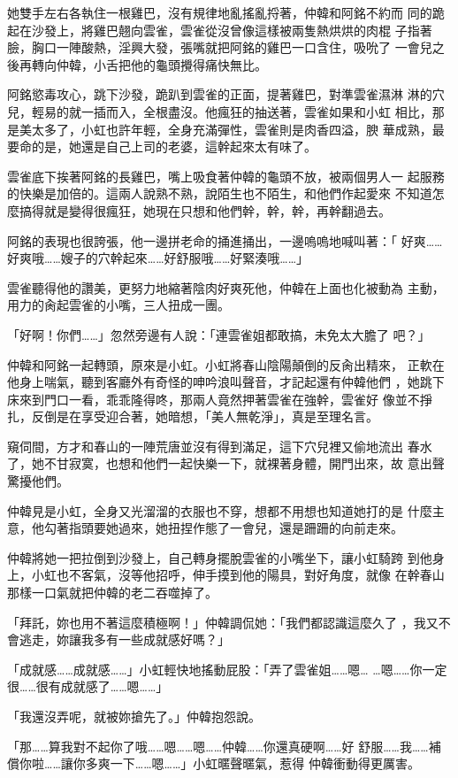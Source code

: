 她雙手左右各執住一根雞巴，沒有規律地亂搖亂捋著，仲韓和阿銘不約而
同的跪起在沙發上，將雞巴翹向雲雀，雲雀從沒曾像這樣被兩隻熱烘烘的肉棍
子指著臉，胸口一陣酸熱，淫興大發，張嘴就把阿銘的雞巴一口含住，吸吮了
一會兒之後再轉向仲韓，小舌把他的龜頭攪得痛快無比。

阿銘慾毒攻心，跳下沙發，跪趴到雲雀的正面，提著雞巴，對準雲雀濕淋
淋的穴兒，輕易的就一插而入，全根盡沒。他瘋狂的抽送著，雲雀如果和小虹
相比，那是美太多了，小虹也許年輕，全身充滿彈性，雲雀則是肉香四溢，腴
華成熟，最要命的是，她還是自己上司的老婆，這幹起來太有味了。

雲雀底下挨著阿銘的長雞巴，嘴上吸食著仲韓的龜頭不放，被兩個男人一
起服務的快樂是加倍的。這兩人說熟不熟，說陌生也不陌生，和他們作起愛來
不知道怎麼搞得就是變得很瘋狂，她現在只想和他們幹，幹，幹，再幹翻過去。

阿銘的表現也很誇張，他一邊拼老命的捅進捅出，一邊嗚嗚地喊叫著：「
好爽……好爽哦……嫂子的穴幹起來……好舒服哦……好緊湊哦……」

雲雀聽得他的讚美，更努力地縮著陰肉好爽死他，仲韓在上面也化被動為
主動，用力的肏起雲雀的小嘴，三人扭成一團。

「好啊！你們……」忽然旁邊有人說：「連雲雀姐都敢搞，未免太大膽了
吧？」

仲韓和阿銘一起轉頭，原來是小虹。小虹將春山陰陽顛倒的反肏出精來，
正軟在他身上喘氣，聽到客廳外有奇怪的呻吟浪叫聲音，才記起還有仲韓他們
，她跳下床來到門口一看，乖乖隆得咚，那兩人竟然押著雲雀在強幹，雲雀好
像並不掙扎，反倒是在享受迎合著，她暗想，「美人無乾淨」，真是至理名言。

窺伺間，方才和春山的一陣荒唐並沒有得到滿足，這下穴兒裡又偷地流出
春水了，她不甘寂寞，也想和他們一起快樂一下，就裸著身體，開門出來，故
意出聲驚擾他們。

仲韓見是小虹，全身又光溜溜的衣服也不穿，想都不用想也知道她打的是
什麼主意，他勾著指頭要她過來，她扭捏作態了一會兒，還是跚跚的向前走來。

仲韓將她一把拉倒到沙發上，自己轉身擺脫雲雀的小嘴坐下，讓小虹騎跨
到他身上，小虹也不客氣，沒等他招呼，伸手摸到他的陽具，對好角度，就像
在幹春山那樣一口氣就把仲韓的老二吞噬掉了。

「拜託，妳也用不著這麼積極啊！」仲韓調侃她：「我們都認識這麼久了
，我又不會逃走，妳讓我多有一些成就感好嗎？」

「成就感……成就感……」小虹輕快地搖動屁股：「弄了雲雀姐……嗯…
…嗯……你一定很……很有成就感了……嗯……」

「我還沒弄呢，就被妳搶先了。」仲韓抱怨說。

「那……算我對不起你了哦……嗯……嗯……仲韓……你還真硬啊……好
舒服……我……補償你啦……讓你多爽一下……嗯……」小虹暱聲暱氣，惹得
仲韓衝動得更厲害。


